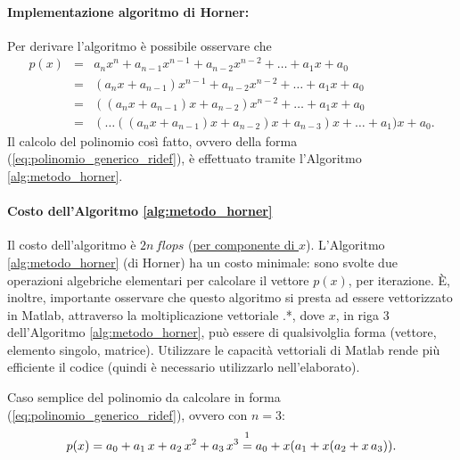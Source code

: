 \paragraph{Implementazione algoritmo di Horner:}  Per derivare l'algoritmo è possibile osservare che
\begin{equation*}
	\begin{matrix}
		p(x) &=& a_n x^n + a_{n-1} x^{n-1} + a_{n-2} x^{n-2} + \hdots + a_1 x + a_0\\
				&=& (a_n x + a_{n-1}) x^{n-1} + a_{n-2} x^{n-2} + \hdots + a_1 x + a_0\\
				&=& ((a_n x + a_{n-1})x + a_{n-2})x^{n-2} + \hdots + a_1 x + a_0\\
				&=& (\hdots ((a_n x + a_{n-1})x + a_{n-2})x + a_{n-3}) x + \hdots + a_1 ) x + a_0.
	\end{matrix}
\end{equation*}
Il calcolo del polinomio così fatto, ovvero della forma (\ref{eq:polinomio_generico_ridef}), è effettuato tramite l'Algoritmo \ref{alg:metodo_horner}.

\paragraph{Costo dell'Algoritmo \ref{alg:metodo_horner}} Il costo dell'algoritmo è $2n\, flops$ (\underline{per componente di $x$}). L'Algoritmo \ref{alg:metodo_horner} (di Horner) ha un costo minimale: sono svolte due operazioni algebriche elementari per calcolare il vettore $p(x)$, per iterazione. È, inoltre, importante osservare che questo algoritmo si presta ad essere vettorizzato in Matlab, attraverso la moltiplicazione vettoriale .*, dove $x$, in riga 3 dell'Algoritmo \ref{alg:metodo_horner}, può essere di qualsivolglia forma (vettore, elemento singolo, matrice). Utilizzare le capacità vettoriali di Matlab rende più efficiente il codice (quindi è necessario utilizzarlo nell'elaborato).


\begin{example}
	Caso semplice del polinomio da calcolare in forma (\ref{eq:polinomio_generico_ridef}), ovvero con $n=3$:
	\begin{equation*}
		p(x)=a_0+a_1\,x+a_2\,x^2+a_3\,x^3\overset{\footnotemark}{=} a_0+ x(a_1+x(a_2+x\,a_3)).
	\end{equation*}
\end{example}

